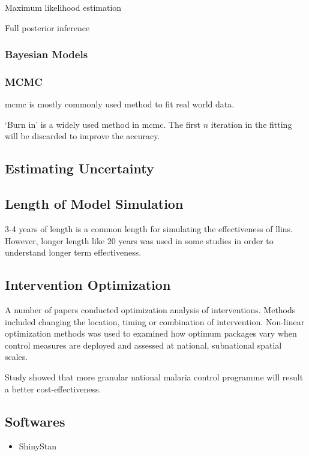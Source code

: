 \documentclass[a4paper, 12pt, twoside]{article}
\begin{document}
Maximum likelihood estimation

Full posterior inference

\subsubsection{Bayesian Models}

\subsubsection{MCMC}

\gls{mcmc} is mostly commonly used method to fit real world data.

`Burn in' is a widely used method in \gls{mcmc}. The first $n$ iteration in the fitting will be discarded to improve the accuracy.

\subsection{Estimating Uncertainty}

\subsection{Length of Model Simulation}
3-4 years of length is a common length for simulating the effectiveness of \gls{llins}. However, longer length like 20 years was used in some studies in order to understand longer term effectiveness\cite{Walker2016}.

\subsection{Intervention Optimization}
A number of papers conducted optimization analysis of interventions.
Methods included changing the location, timing or combination of intervention.
Non-linear optimization methods\cite{Walker2016} was used to examined how optimum packages vary when control measures are deployed and assessed at national, subnational spatial scales.

Study showed that more granular national malaria control programme will result a better cost-effectiveness\cite{Walker2016}.
\subsection{Softwares}

\begin{itemize}
	\item ShinyStan
\end{itemize}
\end{document}
